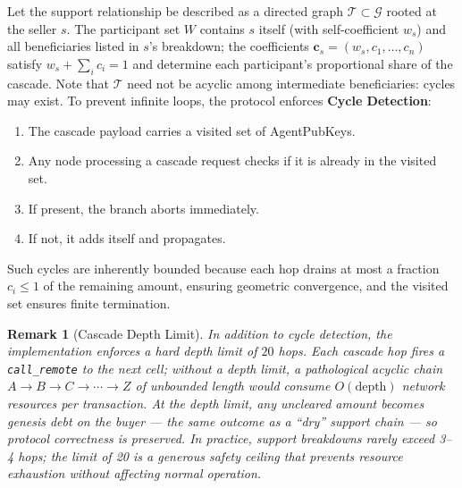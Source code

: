 \documentclass[11pt]{article}
\newtheorem{remark}[theorem]{Remark}
\begin{document}
Let the support relationship be described as a directed graph $\mathcal{T} \subset \mathcal{G}$ rooted at the seller $s$. The participant set $W$ contains $s$ itself (with self-coefficient $w_s$) and all beneficiaries listed in $s$'s breakdown; the coefficients $\mathbf{c}_s = (w_s, c_1, \ldots, c_n)$ satisfy $w_s + \sum_i c_i = 1$ and determine each participant's proportional share of the cascade. Note that $\mathcal{T}$ need not be acyclic among intermediate beneficiaries: cycles may exist. To prevent infinite loops, the protocol enforces \textbf{Cycle Detection}:
\begin{enumerate}
    \item The cascade payload carries a visited set of AgentPubKeys.
    \item Any node processing a cascade request checks if it is already in the visited set.
    \item If present, the branch aborts immediately.
    \item If not, it adds itself and propagates.
\end{enumerate}
Such cycles are inherently bounded because each hop drains at most a fraction $c_i \leq 1$ of the remaining amount, ensuring geometric convergence, and the visited set ensures finite termination.

\begin{remark}[Cascade Depth Limit]\label{rem:cascade_depth}
In addition to cycle detection, the implementation enforces a hard depth limit of $20$ hops. Each cascade hop fires a \texttt{call\_remote} to the next cell; without a depth limit, a pathological acyclic chain $A \to B \to C \to \cdots \to Z$ of unbounded length would consume $O(\text{depth})$ network resources per transaction. At the depth limit, any uncleared amount becomes genesis debt on the buyer — the same outcome as a ``dry'' support chain — so protocol correctness is preserved. In practice, support breakdowns rarely exceed 3--4 hops; the limit of 20 is a generous safety ceiling that prevents resource exhaustion without affecting normal operation.
\end{remark}
\end{document}
